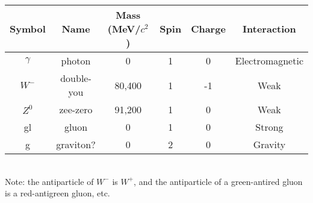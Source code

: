 \documentclass[11pt]{article}
\begin{document}
\begin{table}[tbp]
\begin{tabular}[t]{cccccc}
  Symbol & Name & Mass (MeV/$c^2$) & Spin & Charge & Interaction \\
  \hline\hline
  $\gamma$ & photon & 0 & 1 & 0 & Electromagnetic \\
  $W^-$ & double-you & 80,400 & 1 & -1 & Weak \\
  $Z^0$ & zee-zero & 91,200 & 1 & 0 & Weak \\
  gl & gluon & 0 & 1 & 0 & Strong \\
  g & graviton? & 0 & 2 & 0 & Gravity \\
  \hline
\end{tabular}\\[0.5ex]
Note: the antiparticle of $W^-$ is $W^+$, and the antiparticle of
a green-antired gluon is a red-antigreen gluon, etc.
\end{table}
\end{document}
